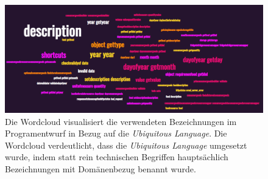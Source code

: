\begin{figure}[H]
	\centering
	\includegraphics[width=1.0\textwidth]{Bilder/wordcloud.PNG}
	\caption[Wordcloud in Bezug zur Verdeutlichung der Umsetzung Ubiquitous Language.]{Die Wordcloud visualisiert die verwendeten Bezeichnungen im Programentwurf in Bezug auf die \textit{Ubiquitous Language}. Die Wordcloud verdeutlicht, dass die \textit{Ubiquitous Language} umgesetzt wurde, indem statt rein technischen Begriffen hauptsächlich Bezeichnungen mit Domänenbezug benannt wurde.}
	\label{fig:wordcloud}
\end{figure}

